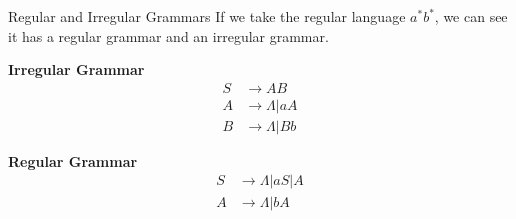 \begin{example}{Regular and Irregular Grammars}
If we take the regular language $a^*b^*$, we can see it has a regular grammar and an irregular grammar. 

\begin{multicols}{2}
\textbf{Irregular Grammar}
\begin{align*}
S &\rightarrow AB\\
A &\rightarrow \Lambda | aA\\
B &\rightarrow \Lambda | Bb 
\end{align*}

\columnbreak

\textbf{Regular Grammar}
\begin{align*}
S &\rightarrow \Lambda | aS | A\\
A &\rightarrow \Lambda | bA
\end{align*}
\vfill\null
\end{multicols}

\end{example}